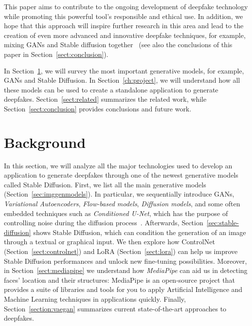 \documentclass[sn-mathphys,Numbered]{sn-jnl}
\theoremstyle{thmstyleone}%
\theoremstyle{thmstyletwo}%
\theoremstyle{thmstylethree}%
\begin{document}
This paper aims to contribute to the ongoing development of 
deepfake technology while promoting this powerful tool's responsible and ethical use.  In addition, we hope that this approach will inspire further research in this area and lead to the creation of even more advanced and innovative deepfake techniques, for example, mixing GANs and Stable diffusion together~\cite{mix} (see also the conclusions of this paper in Section~\ref{sect:conclusion}).



In Section~\ref{sect:background}, we will survey the most important generative models, for example, GANs and Stable Diffusion.
In Section~\ref{ch:project}, we will understand how all these models can be used to create a standalone application to generate deepfakes. Section~\ref{sect:related} summarizes the related work, while Section~\ref{sect:conclusion} provides conclusions and future work.


\section{Background}\label{sect:background}


In this section, we will analyze all the major technologies used to develop an application to generate 
deepfakes through one of the newest generative models called Stable Diffusion. First, we list all the main generative models (Section~\ref{sec:imggenmodels}). In particular, we sequentially introduce GANs, \emph{Variational Autoencoders}, \emph{Flow-based models}, \emph{Diffusion models}, and some often embedded techniques such as \emph{Conditioned U-Net}, which has the purpose of controlling noise during the diffusion process~\cite{conditionedunet}.
Afterwards, Section~\ref{sec:stable-diffusion} shows  Stable Diffusion, which can condition the 
generation of an image through a textual or graphical input.
We  then explore how ControlNet  (Section~\ref{sect:controlnet}) and LoRA (Section~\ref{sect:lora}) can help us improve Stable Diffusion performances and unlock new fine-tuning possibilities. 
Moreover, in Section~\ref{sect:mediapipe} we  understand how \emph{MediaPipe} can aid us in detecting faces' location and their structures: MediaPipe  is an open-source project that provides a suite of libraries and tools for you to apply Artificial Intelligence and Machine Learning techniques in applications quickly.
Finally, Section~\ref{section:vaegan}  summarizes current state-of-the-art approaches to deepfakes.
\end{document}
